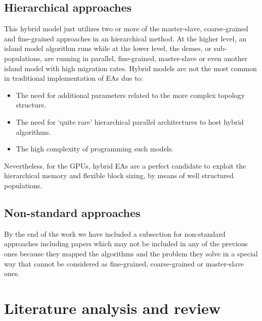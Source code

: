 \documentclass{article}
\begin{document}
\subsection{Hierarchical approaches}
\label{subsec:hierarchicalapproaches}

This hybrid model just utilizes two or more of the master-slave, coarse-grained and fine-grained approaches in an hierarchical method. At the higher level, an island model algorithm runs while at the lower level, the demes, or sub-populations, are running in parallel, fine-grained, master-slave or even another island model with high migration rates. Hybrid models are not the most common in traditional implementation of EAs due to:
\begin{itemize}
 \item The need for additional parameters related to the more complex topology structure. 
 \item The need for `quite rare' hierarchical parallel architectures to host hybrid algorithms. 
\item The high complexity of programming such models. 
\end{itemize}

Nevertheless, for the GPUs, hybrid EAs are a perfect candidate to exploit the hierarchical memory and flexible block sizing, by means of well structured populations. 


\subsection{Non-standard approaches}
\label{subsec:nonstandardapproaches}

By the end of the work we have included a subsection for non-standard
approaches \cite{DBLP:conf/gecco/PospichalMOSJ11} including papers
which may not be included in any of the previous ones because they
mapped the algorithms and the problem they solve in a special way that
cannot be considered as fine-grained, coarse-grained or master-slave
ones. 



\section{Literature analysis and review} 
\label{sec:survey}
\end{document}
